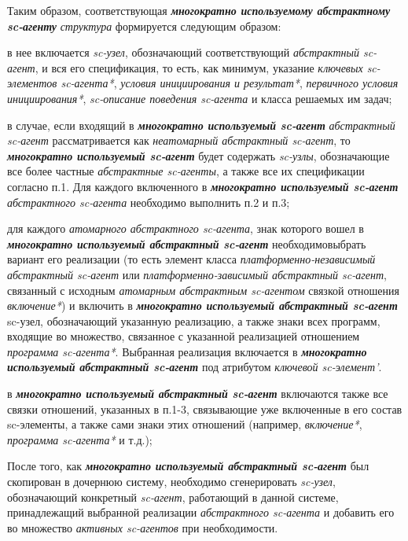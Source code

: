 \begin{SCn}
{Таким образом, соответствующая \textbf{\textit{многократно используемому абстрактному sc-агенту}} \textit{структура} формируется следующим образом:
\begin{scnenumerate}
    \item в нее включается \textit{sc-узел}, обозначающий соответствующий \textit{абстрактный sc-агент}, и вся его спецификация, то есть, как минимум, указание \textit{ключевых sc-элементов sc-агента*}, \textit{условия инициирования и результат*}, \textit{первичного условия инициирования*}, \textit{sc-описание поведения sc-агента} и класса решаемых им задач;
    \item в случае, если входящий в \textbf{\textit{многократно используемый sc-агент}} \textit{абстрактный sc-агент} рассматривается как \textit{неатомарный абстрактный sc-агент}, то \textbf{\textit{многократно используемый sc-агент}} будет содержать \textit{sc-узлы}, обозначающие все более частные \textit{абстрактные sc-агенты}, а также все их спецификации согласно п.1. Для каждого включенного в \textbf{\textit{многократно используемый sc-агент}} \textit{абстрактного sc-агента} необходимо выполнить п.2 и п.3;
    \item для каждого \textit{атомарного абстрактного sc-агента}, знак которого вошел в \textbf{\textit{многократно используемый абстрактный sc-агент}} необходимовыбрать вариант его реализации (то есть элемент класса \textit{платформенно-независимый абстрактный sc-агент} или \textit{платформенно-зависимый абстрактный sc-агент}, связанный с исходным \textit{атомарным абстрактным sc-агентом} связкой отношения \textit{включение*}) и включить в \textbf{\textit{многократно используемый абстрактный sc-агент}} sc-узел, обозначающий указанную реализацию, а также знаки всех программ, входящие во множество, связанное с указанной реализацией отношением \textit{программа sc-агента*}. Выбранная реализация включается в \textbf{\textit{многократно используемый абстрактный sc-агент}} под атрибутом \textit{ключевой sc-элемент'}.
    \item в \textbf{\textit{многократно используемый абстрактный sc-агент}} включаются также все связки отношений, указанных в п.1-3, связывающие уже включенные в его состав sc-элементы, а также сами знаки этих отношений (например, \textit{включение*}, \textit{программа sc-агента*} и т.д.);
\end{scnenumerate}
После того, как \textbf{\textit{многократно используемый абстрактный sc-агент}} был скопирован в дочернюю систему, необходимо сгенерировать \textit{sc-узел}, обозначающий конкретный \textit{sc-агент}, работающий в данной системе, принадлежащий выбранной реализации \textit{абстрактного sc-агента} и добавить его во множество \textit{активных sc-агентов} при необходимости.

}
\end{SCn}
